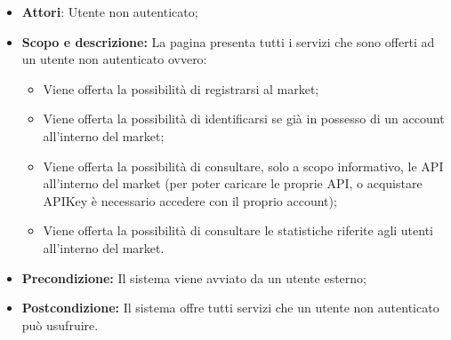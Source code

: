\documentclass[12pt,a4paper,titlepage]{article}
\begin{document}
	\begin{itemize}
		\item \textbf{Attori}: Utente non autenticato;
		\item \textbf{Scopo e descrizione:} La pagina presenta tutti i servizi che sono offerti ad un utente non autenticato ovvero:
		\begin{itemize} 
			\item Viene offerta la possibilità di registrarsi al market; 
			\item Viene offerta la possibilità di identificarsi se già in possesso di un account all'interno del market;
			\item Viene offerta la possibilità di consultare, solo a scopo informativo, le API all'interno del market (per poter caricare le proprie API, o acquistare APIKey è necessario accedere con il proprio account); 
			\item Viene offerta la possibilità di consultare le statistiche riferite agli utenti all'interno del market.
		\end{itemize}
		\item \textbf{Precondizione:} Il sistema viene avviato da un utente esterno;
		\item \textbf{Postcondizione:} Il sistema offre tutti servizi che un utente non autenticato può usufruire.
	\end{itemize}
\end{document}
